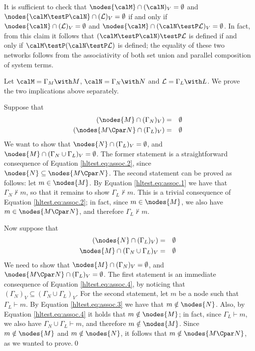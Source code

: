 \documentclass{LMCS}
\newcommand{\calL}{\ensuremath{{\mathcal{L}}}}
\begin{document}
It is sufficient to check that 
$\nodes{\calM} \cap (\calN)_V = \emptyset$ and 
$\nodes{\calM \testP \calN} \cap (\calL)_V = \emptyset$ 
if and only if $\nodes{\calN} \cap (\calL)_V= \emptyset$ and 
$\nodes{\calM} \cap (\calN \testP \calL)_V = \emptyset$.
In fact, from this claim it follows that $(\calM \testP \calN) \testP \calL$ is 
defined if and only if $\calM \testP (\calN \testP \calL)$ is defined; the 
equality of these two networks follows from the associativity of both set 
union and parallel composition of system terms.

Let $\calM = \Gamma_M \with M$, 
$\calN = \Gamma_N \with N$ and $\calL = \Gamma_L 
\with L$. We prove the two implications above separately.

Suppose that 
\begin{eqnarray}
(\nodes{M} \cap (\Gamma_N)_V) &=& \emptyset\label{hltest.eq:assoc.1}\\
(\nodes{M \Cpar N} \cap (\Gamma_L)_V) &=& \emptyset\label{hltest.eq:assoc.2}
\end{eqnarray}
We want to show that $\nodes{N} \cap (\Gamma_L)_V = \emptyset$, and 
$\nodes{M} \cap (\Gamma_N \cup \Gamma_L)_V = \emptyset$. The former 
statement is a straightforward consequence of Equation \eqref{hltest.eq:assoc.2}, 
since $\nodes{N} \subseteq \nodes{M \Cpar N}$.
The second statement can be proved as follows: let $m \in \nodes{M}$. By Equation 
\eqref{hltest.eq:assoc.1} we have that $\Gamma_N \not\vdash m$, so that 
it remains to show $\Gamma_L \not\vdash m$. This is a trivial consequence 
of Equation \eqref{hltest.eq:assoc.2}; in fact, since $m \in \nodes{M}$, we 
also have $m \in \nodes{M \Cpar N}$, and therefore $\Gamma_L \not\vdash m$.

Now suppose that 
\begin{eqnarray}
(\nodes{N} \cap (\Gamma_L)_V) &=& \emptyset\label{hltest.eq:assoc.3}\\
\nodes{M} \cap (\Gamma_N \cup \Gamma_L)_V &=& \emptyset\label{hltest.eq:assoc.4}
\end{eqnarray}
We need to show that $\nodes{M} \cap (\Gamma_N)_V = \emptyset$, and 
$\nodes{M \Cpar N} \cap (\Gamma_L)_V = \emptyset$. The first statement is 
an immediate consequence of Equation \eqref{hltest.eq:assoc.4}, by noticing 
that $(\Gamma_N)_V \subseteq (\Gamma_N \cup \Gamma_L)_V$. 
For the second 
statement, let $m$ be a node such that $\Gamma_L \vdash m$. By Equation 
\eqref{hltest.eq:assoc.3} we have that $m \notin \nodes{N}$. Also, 
by Equation \eqref{hltest.eq:assoc.4} it holds that $m \notin \nodes{M}$; 
in fact, since $\Gamma_L \vdash m$, we also have $\Gamma_N \cup \Gamma_L 
\vdash m$, and therefore $m \notin \nodes{M}$. 
Since $m \notin \nodes{M}$ and $m \notin \nodes{N}$, it follows that 
$m \notin \nodes{M \Cpar N}$, as we wanted to prove.\hfill\qed
\end{document}
